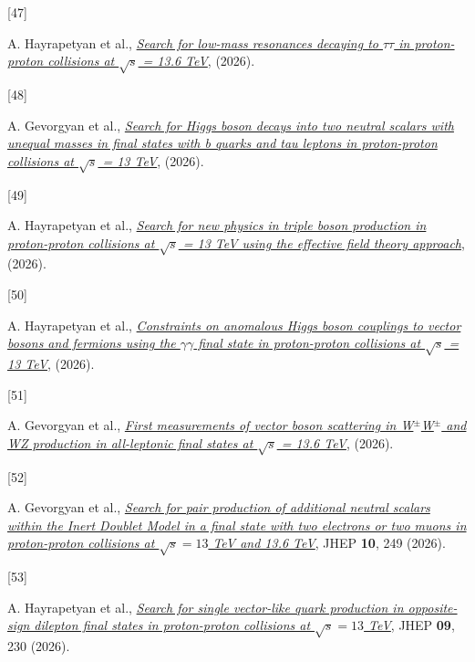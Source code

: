 \documentclass[
]{article}
\newlength{\cslhangindent}
\newlength{\csllabelwidth}
\newenvironment{CSLReferences}[2] %
 {\begin{list}{}{%
  \setlength{\itemindent}{0pt}
  \setlength{\leftmargin}{0pt}
  \setlength{\parsep}{0pt}
  \ifodd #1
   \setlength{\leftmargin}{\cslhangindent}
   \setlength{\itemindent}{-1\cslhangindent}
  \fi
  \setlength{\itemsep}{#2\baselineskip}}}
 {\end{list}}
\newcommand{\CSLLeftMargin}[1]{\parbox[t]{\csllabelwidth}{\strut#1\strut}}
\newcommand{\CSLRightInline}[1]{\parbox[t]{\linewidth - \csllabelwidth}{\strut#1\strut}}
\begin{document}
\begin{CSLReferences}{0}{0}
\CSLLeftMargin{{[}47{]} }%
\CSLRightInline{A. Hayrapetyan et al.,
\emph{\href{https://arxiv.org/abs/2605.25103}{{Search for low-mass
resonances decaying to \(\ensuremath{\tau}\ensuremath{\tau}\) in proton-proton collisions at
\(\sqrt{s}\) = 13.6 TeV}}}, (2026).}

\CSLLeftMargin{{[}48{]} }%
\CSLRightInline{A. Gevorgyan et al.,
\emph{\href{https://arxiv.org/abs/2605.19144}{{Search for Higgs boson
decays into two neutral scalars with unequal masses in final states with
b quarks and tau leptons in proton-proton collisions at \(\sqrt{s}\) =
13 TeV}}}, (2026).}

\CSLLeftMargin{{[}49{]} }%
\CSLRightInline{A. Hayrapetyan et al.,
\emph{\href{https://arxiv.org/abs/2605.15023}{{Search for new physics in
triple boson production in proton-proton collisions at \(\sqrt{s}\) = 13
TeV using the effective field theory approach}}}, (2026).}

\CSLLeftMargin{{[}50{]} }%
\CSLRightInline{A. Hayrapetyan et al.,
\emph{\href{https://arxiv.org/abs/2605.14245}{{Constraints on anomalous
Higgs boson couplings to vector bosons and fermions using the \(\ensuremath{\gamma}\ensuremath{\gamma}\)
final state in proton-proton collisions at \(\sqrt{s}\) = 13 TeV}}},
(2026).}

\CSLLeftMargin{{[}51{]} }%
\CSLRightInline{A. Gevorgyan et al.,
\emph{\href{https://arxiv.org/abs/2605.15396}{{First measurements of
vector boson scattering in W\(^\pm\)W\(^{\pm}\) and WZ production in
all-leptonic final states at \(\sqrt{s}\) = 13.6 TeV}}}, (2026).}

\CSLLeftMargin{{[}52{]} }%
\CSLRightInline{A. Gevorgyan et al.,
\emph{\href{https://doi.org/10.1007/JHEP10(2026)249}{{Search for pair
production of additional neutral scalars within the Inert Doublet Model
in a final state with two electrons or two muons in proton-proton
collisions at \(\sqrt{s}=13\) TeV and 13.6 TeV}}}, JHEP \textbf{10}, 249
(2026).}

\CSLLeftMargin{{[}53{]} }%
\CSLRightInline{A. Hayrapetyan et al.,
\emph{\href{https://doi.org/10.1007/JHEP09(2026)230}{{Search for single
vector-like quark production in opposite-sign dilepton final states in
proton-proton collisions at \(\sqrt{s}=13\) TeV}}}, JHEP \textbf{09},
230 (2026).}


\end{CSLReferences}
\end{document}

